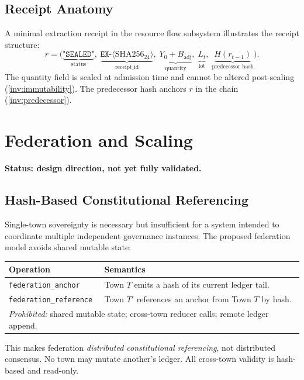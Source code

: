 \documentclass[11pt,a4paper]{article}
\theoremstyle{plain}
\theoremstyle{definition}
\theoremstyle{remark}
\begin{document}
\subsection{Receipt Anatomy}

A minimal extraction receipt in the resource flow subsystem illustrates
the receipt structure:
\[
  r = \bigl(
    \underbrace{\texttt{"SEALED"}}_{\text{status}},\;
    \underbrace{\texttt{EX-}\langle \mathrm{SHA256}_{24}\rangle}_{\text{receipt\_id}},\;
    \underbrace{Y_0 + B_{\mathrm{adj}}}_{\text{quantity}},\;
    \underbrace{L_t}_{\text{lot}},\;
    \underbrace{H(r_{t-1})}_{\text{predecessor hash}}
  \bigr).
\]
The quantity field is sealed at admission time and cannot be altered post-sealing
(\cref{inv:immutability}).
The predecessor hash anchors $r$ in the chain (\cref{inv:predecessor}).

\section{Federation and Scaling}
\label{sec:federation}

\textbf{Status: design direction, not yet fully validated.}

\subsection{Hash-Based Constitutional Referencing}

Single-town sovereignty is necessary but insufficient for a system
intended to coordinate multiple independent governance instances.
The proposed federation model avoids shared mutable state:

\begin{center}
\begin{tabular}{lp{9cm}}
\toprule
Operation & Semantics \\
\midrule
\texttt{federation\_anchor}   & Town $T$ emits a hash of its current ledger tail. \\
\texttt{federation\_reference} & Town $T'$ references an anchor from Town $T$ by hash. \\
\midrule
\multicolumn{2}{l}{\textit{Prohibited:} shared mutable state; cross-town reducer calls; remote ledger append.} \\
\bottomrule
\end{tabular}
\end{center}

This makes federation \emph{distributed constitutional referencing},
not distributed consensus.
No town may mutate another's ledger.
All cross-town validity is hash-based and read-only.
\end{document}
